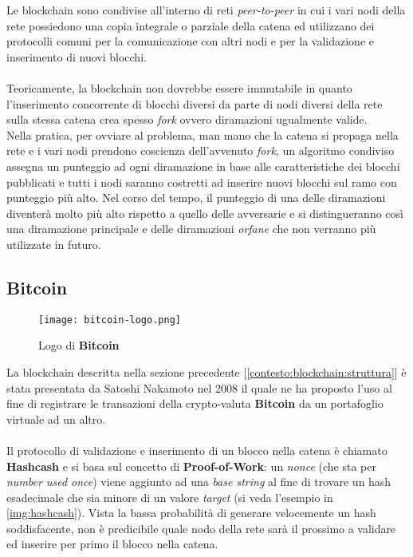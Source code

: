     Le blockchain sono condivise all'interno di reti \textit{peer-to-peer} in cui i vari nodi della rete possiedono una copia integrale o parziale della catena ed utilizzano dei protocolli comuni per la comunicazione con altri nodi e per la validazione e inserimento di nuovi blocchi.
    \\\\
    Teoricamente, la blockchain non dovrebbe essere immutabile in quanto l'inserimento concorrente di blocchi diversi da parte di nodi diversi della rete sulla stessa catena crea spesso \textit{fork} ovvero diramazioni ugualmente valide.\\
    Nella pratica, per ovviare al problema, man mano che la catena si propaga nella rete e i vari nodi prendono coscienza dell'avvenuto \textit{fork}, un algoritmo condiviso assegna un punteggio ad ogni diramazione in base alle caratteristiche dei blocchi pubblicati e tutti i nodi saranno costretti ad inserire nuovi blocchi sul ramo con punteggio più alto. Nel corso del tempo, il punteggio di una delle diramazioni diventerà molto più alto rispetto a quello delle avversarie e si distingueranno così una diramazione principale e delle diramazioni \textit{orfane} che non verranno più utilizzate in futuro.

    \subsection{Bitcoin}

    \begin{figure}[h!]
        \centering
        \texttt{[image: bitcoin-logo.png]}
        \caption{Logo di \textbf{Bitcoin}}
    \end{figure}

    La blockchain descritta nella sezione precedente [\autoref{contesto:blockchain:struttura}] è stata presentata da Satoshi Nakamoto nel 2008 \cite{nakamoto2008bitcoin} il quale ne ha proposto l'uso al fine di registrare le transazioni della crypto-valuta \textbf{Bitcoin} da un portafoglio virtuale ad un altro.
    \\\\
    Il protocollo di validazione e inserimento di un blocco nella catena è chiamato \textbf{Hashcash} e si basa sul concetto di \textbf{Proof-of-Work}: un \textit{nonce} (che sta per \textit{number used once}) viene aggiunto ad una \textit{base string} al fine di trovare un hash esadecimale che sia minore di un valore \textit{target} (si veda l'esempio in \autoref{img:hashcash}). Vista la bassa probabilità di generare velocemente un hash soddisfacente, non è predicibile quale nodo della rete sarà il prossimo a validare ed inserire per primo il blocco nella catena.

